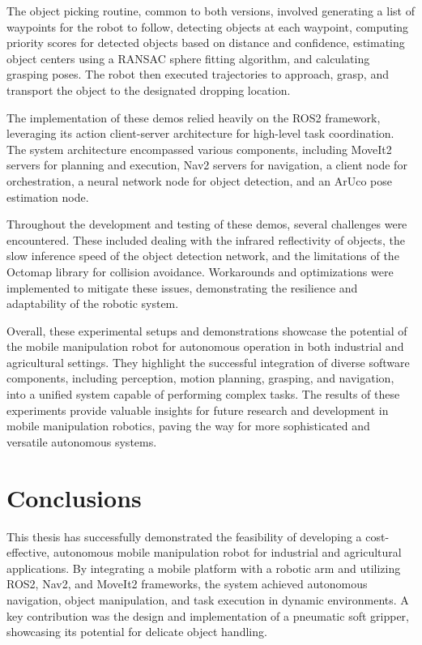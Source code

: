 The object picking routine, common to both versions, involved generating a list of waypoints for the robot to follow,
detecting objects at each waypoint, computing priority scores for detected objects based on distance and confidence, 
estimating object centers using a RANSAC sphere fitting algorithm, and calculating grasping poses. The robot then 
executed trajectories to approach, grasp, and transport the object to the designated dropping location.

The implementation of these demos relied heavily on the ROS2 framework, leveraging its action client-server 
architecture for high-level task coordination. The system architecture encompassed various components, including 
MoveIt2 servers for planning and execution, Nav2 servers for navigation, a client 
node for orchestration, a neural network node for object detection, and an ArUco pose estimation node.

Throughout the development and testing of these demos, several challenges were encountered. These included 
dealing with the infrared reflectivity of objects, the slow inference speed of the object detection network, 
and the limitations of the Octomap library for collision avoidance. Workarounds and optimizations were 
implemented to mitigate these issues, demonstrating the resilience and adaptability of the robotic system.

Overall, these experimental setups and demonstrations showcase the potential of the mobile manipulation robot
for autonomous operation in both industrial and agricultural settings. They highlight the successful integration 
of diverse software components, including perception, motion planning, grasping, and navigation, into a 
unified system capable of performing complex tasks.  The results of these experiments provide valuable insights
for future research and development in mobile manipulation robotics, paving the way for more sophisticated 
and versatile autonomous systems.

\section{Conclusions}

This thesis has successfully demonstrated the feasibility of developing a cost-effective, autonomous mobile 
manipulation robot for industrial and agricultural applications. By integrating a mobile platform with a robotic
arm and utilizing ROS2, Nav2, and MoveIt2 frameworks, the system achieved autonomous navigation, object manipulation, 
and task execution in dynamic environments. A key contribution was the design and implementation of a pneumatic 
soft gripper, showcasing its potential for delicate object handling.

